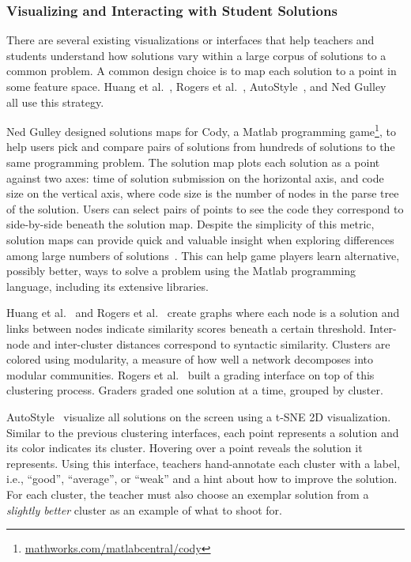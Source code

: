 \subsubsection{Visualizing and Interacting with Student Solutions}

There are several existing visualizations or interfaces that help teachers and students understand how solutions vary within a large corpus of solutions to a common problem. A common design choice is to map each solution to a point in some feature space. Huang et al.~\cite{MOOCshop}, Rogers et al.~\cite{ACESthesis}, AutoStyle~\cite{choudhury2016autostyle}, and Ned Gulley~\cite{ICERGlassman} all use this strategy. %


Ned Gulley designed solutions maps for Cody, a Matlab programming game\footnote{\url{mathworks.com/matlabcentral/cody}}, to help users pick and compare pairs of solutions from hundreds of solutions to the same programming problem. The solution map plots each solution as a point against two axes: time of solution submission on the horizontal axis, and code size on the vertical axis, where code size is the number of nodes in the parse tree of the solution. Users can select pairs of points to see the code they correspond to side-by-side beneath the solution map. Despite the simplicity of this metric, solution maps can provide quick and valuable insight when exploring differences among large numbers of solutions~\cite{ICERGlassman}. This can help game players learn alternative, possibly better, ways to solve a problem using the Matlab programming language, including its extensive libraries.

Huang et al.~\cite{MOOCshop} and Rogers et al.~\cite{ACESthesis} create graphs where each node is a solution and links between nodes indicate similarity scores beneath a certain threshold. Inter-node and inter-cluster distances correspond to syntactic similarity. Clusters are colored using modularity, a measure of how well a network decomposes into modular communities. Rogers et al.~\cite{ACESthesis} built a grading interface on top of this clustering process. Graders graded one solution at a time, grouped by cluster.

AutoStyle~\cite{choudhury2016autostyle} visualize all solutions on the screen using a t-SNE 2D visualization. Similar to the previous clustering interfaces, each point represents a solution and its color indicates its cluster. Hovering over a point reveals the solution it represents. Using this interface, teachers hand-annotate each cluster with a label, i.e., ``good'', ``average'', or ``weak'' and a hint about how to improve the solution. For each cluster, the teacher must also choose an exemplar solution from a {\it slightly better} cluster as an example of what to shoot for.

